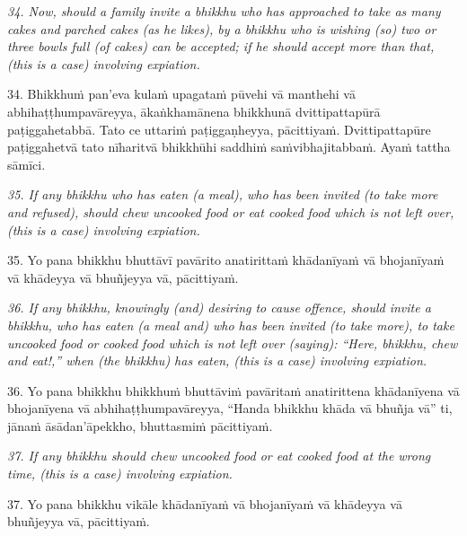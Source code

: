 \documentclass[11pt]{article}
\begin{document}
\begin{paracol}{2}
\begin{column}
{\itshape\footnotesize
34. Now, should a family invite a bhikkhu who has approached to take as many cakes and parched cakes (as he likes), by a bhikkhu who is wishing (so) two or three bowls full (of cakes) can be accepted; if he should accept more than that, (this is a case) involving expiation.
}
\switchcolumn

\begin{flushleft}
34. Bhikkhuṁ pan’eva kulaṁ upagataṁ pūvehi vā manthehi vā abhihaṭṭhumpavāreyya, ākaṅkhamānena bhikkhunā dvittipattapūrā paṭiggahetabbā. Tato ce uttariṁ paṭiggaṇheyya, pācittiyaṁ. Dvittipattapūre paṭiggahetvā tato nīharitvā bhikkhūhi saddhiṁ saṁvibhajitabbaṁ. Ayaṁ tattha sāmīci.
\switchcolumn*
\end{flushleft}

{\itshape\footnotesize
35. If any bhikkhu who has eaten (a meal), who has been invited (to take more and refused), should chew uncooked food or eat cooked food which is not left over, (this is a case) involving expiation.
}
\switchcolumn

\begin{flushleft}
35. Yo pana bhikkhu bhuttāvī pavārito anatirittaṁ khādanīyaṁ vā bhojanīyaṁ vā khādeyya vā bhuñjeyya vā, pācittiyaṁ.
\switchcolumn*
\end{flushleft}

{\itshape\footnotesize
36. If any bhikkhu, knowingly (and) desiring to cause offence, should invite a bhikkhu, who has eaten (a meal and) who has been invited (to take more), to take uncooked food or cooked food which is not left over (saying): “Here, bhikkhu, chew and eat!,” when (the bhikkhu) has eaten, (this is a case) involving expiation.
}
\switchcolumn

\begin{flushleft}
36. Yo pana bhikkhu bhikkhuṁ bhuttāviṁ pavāritaṁ anatirittena khādanīyena vā bhojanīyena vā abhihaṭṭhumpavāreyya, “Handa bhikkhu khāda vā bhuñja vā” ti, jānaṁ āsādan’āpekkho, bhuttasmiṁ pācittiyaṁ.
\switchcolumn*
\end{flushleft}

{\itshape\footnotesize
37. If any bhikkhu should chew uncooked food or eat cooked food at the wrong time, (this is a case) involving expiation.
}
\switchcolumn

\begin{flushleft}
37. Yo pana bhikkhu vikāle khādanīyaṁ vā bhojanīyaṁ vā khādeyya vā bhuñjeyya vā, pācittiyaṁ.
\switchcolumn*
\end{flushleft}


\end{column}
\end{paracol}
\end{document}
